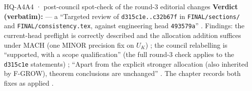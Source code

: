 \begin{card}{HQ-A4}{A4 · post-council spot-check of the round-3 editorial changes}
\textbf{Verdict (verbatim):}   — a ``Targeted review of \texttt{d315c1e..c32b67f} in \texttt{FINAL/sections/} and \texttt{FINAL/consistency.tex}, against engineering head \texttt{493579a}'' . Findings: the current-head preflight is correctly described and the allocation addition suffices under MACH (one MINOR precision fix on $U_K$) ; the council relabelling is ``supported, with a scope qualification'' (the full round-3 check applies to the \texttt{d315c1e} statements) ; ``Apart from the explicit stronger allocation (also inherited by F-GROW), theorem conclusions are unchanged'' . The chapter records both fixes as applied .
\end{card}

